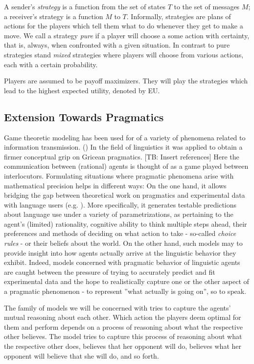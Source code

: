 \documentclass[10pt]{article}
\newcommand{\sh}[1]{\textcolor[rgb]{.8,.33,.0}{[TB: #1]}}%
\begin{document}
A sender's \textit{strategy} is a function from the set of states $T$ to the set of messages $M$; a receiver's strategy is a function $M$ to $T$. Informally, strategies are plans of actions for the players which tell them what to do whenever they get to make a move. We call a strategy \textit{pure} if a player will choose a some action with certainty, that is, always, when confronted with a given situation. In contrast to pure strategies stand
\textit{mixed} strategies where players will choose from various actions, each with a certain probability.

Players are assumed to be payoff maximizers. They will play the strategies which lead to the highest expected utility, denoted by EU.

\subsection{Extension Towards Pragmatics}
Game theoretic modeling has been used for of a variety of phenomena related to information transmission. (\cite{spence1973job, smith1982evolution, cho1987signaling})
In the field of linguistics it was applied to obtain a firmer conceptual grip on Gricean pragmatics.
\sh{Insert references}
Here the communication between (rational) agents is thought of as a game played between interlocutors. Formulating situations where pragmatic phenomena arise with mathematical precision helps in different ways: On the one hand, it allows bridging the gap between theoretical work on pragmatics and experimental data with language users (e.g. \cite{frank2012predicting}). More specifically, it generates testable predictions about language use under a variety of parametrizations, as pertaining to the agent's (limited) rationality, cognitive ability to think multiple steps ahead, their preferences and methods of deciding on what action to take - so-called \textit{choice rules} \cite{galeazzi2017play}
 - or their beliefs about the world. On the other hand, such models may to provide insight into how agents actually arrive at the linguistic behavior they exhibit.
 Indeed, models concerned with pragmatic behavior of linguistic agents are caught between the pressure of trying to accurately predict and fit experimental data and the hope to realistically capture one or the other aspect of a pragmatic phenomenon - to represent ''what actually is going on'', so to speak.

The family of models we will be concerned with tries to capture the agents' mutual reasoning about each other. Which action the players deem optimal for them and perform depends on a process of reasoning about what the respective other believes. The model tries to capture this process of reasoning about what the respective other does, believes that her opponent will do, believes what her opponent will believe that she will do, and so forth.
\end{document}
